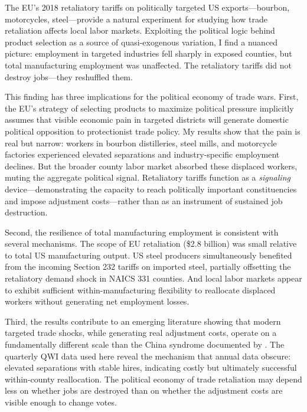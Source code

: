 \documentclass[12pt]{article}
\begin{document}
The EU's 2018 retaliatory tariffs on politically targeted US exports---bourbon, motorcycles, steel---provide a natural experiment for studying how trade retaliation affects local labor markets. Exploiting the political logic behind product selection as a source of quasi-exogenous variation, I find a nuanced picture: employment in targeted industries fell sharply in exposed counties, but total manufacturing employment was unaffected. The retaliatory tariffs did not destroy jobs---they reshuffled them.

This finding has three implications for the political economy of trade wars. First, the EU's strategy of selecting products to maximize political pressure implicitly assumes that visible economic pain in targeted districts will generate domestic political opposition to protectionist trade policy. My results show that the pain is real but narrow: workers in bourbon distilleries, steel mills, and motorcycle factories experienced elevated separations and industry-specific employment declines. But the broader county labor market absorbed these displaced workers, muting the aggregate political signal. Retaliatory tariffs function as a \textit{signaling} device---demonstrating the capacity to reach politically important constituencies and impose adjustment costs---rather than as an instrument of sustained job destruction.

Second, the resilience of total manufacturing employment is consistent with several mechanisms. The scope of EU retaliation (\$2.8 billion) was small relative to total US manufacturing output. US steel producers simultaneously benefited from the incoming Section 232 tariffs on imported steel, partially offsetting the retaliatory demand shock in NAICS 331 counties. And local labor markets appear to exhibit sufficient within-manufacturing flexibility to reallocate displaced workers without generating net employment losses.

Third, the results contribute to an emerging literature showing that modern targeted trade shocks, while generating real adjustment costs, operate on a fundamentally different scale than the China syndrome documented by \citet{autor2013china}. The quarterly QWI data used here reveal the mechanism that annual data obscure: elevated separations with stable hires, indicating costly but ultimately successful within-county reallocation. The political economy of trade retaliation may depend less on whether jobs are destroyed than on whether the adjustment costs are visible enough to change votes.
\end{document}
